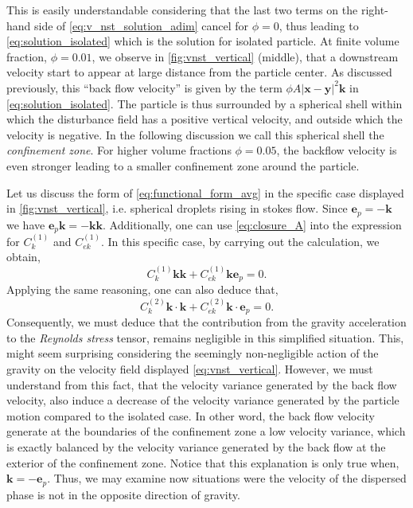 This is easily understandable considering that the last two terms on the right-hand side of \ref{eq:v_nst_solution_adim} cancel for $\phi=0$, thus leading to \ref{eq:solution_isolated} which is the solution for isolated particle. 
At finite volume fraction, $\phi =0.01$, we  observe in \ref{fig:vnst_vertical} (middle), that a downstream velocity start to appear at large distance from the particle center.  
As discussed previously, this ``back flow velocity'' is given by the term $\phi A |\textbf{x}- \textbf{y}|^2 \textbf{k}$ in \ref{eq:solution_isolated}.
The particle is thus surrounded by a spherical shell within which the disturbance field has a positive vertical velocity, and outside which the velocity is negative.
In the following discussion we call this spherical shell the \textit{confinement zone}.   
For higher volume fractions $\phi = 0.05$, the backflow velocity is even stronger leading to a smaller confinement zone around the particle. 

Let us discuss the form of \ref{eq:functional_form_avg} in the specific case displayed in \ref{fig:vnst_vertical}, i.e. spherical droplets rising in stokes flow. 
Since $\textbf{e}_p = - \textbf{k}$ we have $\textbf{e}_p\textbf{k} = - \textbf{kk}$. 
Additionally, one can use \ref{eq:closure_A} into the expression for $C_k^{(1)}$ and $C_{ek}^{(1)}$. 
In this specific case, by carrying out the calculation, we obtain, 
\begin{equation}
    C_k^{(1)} \textbf{kk} + C_{ek}^{(1)} \textbf{ke}_p
    = 0. 
    \label{eq:cancelation1}
\end{equation}
Applying the same reasoning, one can also deduce that, 
\begin{equation}
    C_k^{(2)} \textbf{k}\cdot \textbf{k} + C_{ek}^{(2)} \textbf{k}\cdot \textbf{e}_p
    = 0. 
    \label{eq:cancelation2}
\end{equation}
Consequently, we must deduce that the contribution from the gravity acceleration to the \textit{Reynolds stress} tensor, remains negligible in this simplified situation. 
This, might seem surprising considering the seemingly non-negligible action of the gravity on the velocity field displayed \ref{eq:vnst_vertical}. 
However, we must understand from this fact, that the velocity variance generated by the back flow velocity, also induce a decrease of the velocity variance generated by the particle motion compared to the isolated case.
In other word, the back flow velocity generate at the boundaries of the confinement zone a low velocity variance, which is exactly balanced by the velocity variance generated by the back flow at the exterior of the confinement zone.    
Notice that this explanation is only true when, $\textbf{k} = - \textbf{e}_p$. 
Thus, we may examine now situations were the velocity of the dispersed phase is not in the opposite direction of gravity. 



